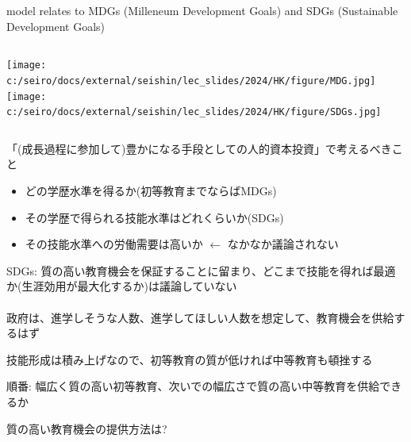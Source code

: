 \begin{frame}{}
\citet{BalandRobinson2000} model relates to MDGs (Milleneum Development Goals) and SDGs (Sustainable Development Goals)\\ 
\hfil\begin{columns}[T]
\column{.4\paperwidth}
\texttt{[image: c:/seiro/docs/external/seishin/lec\_slides/2024/HK/figure/MDG.jpg]}
\column{.4\paperwidth}
\texttt{[image: c:/seiro/docs/external/seishin/lec\_slides/2024/HK/figure/SDGs.jpg]}
\end{columns}

\vspace{2ex}
\pause
「(成長過程に参加して)豊かになる手段としての人的資本投資」で考えるべきこと
\begin{itemize}
\vspace{1.0ex}\setlength{\itemsep}{1.0ex}\setlength{\baselineskip}{12pt}
\pause
\item	どの学歴水準を得るか(初等教育までならばMDGs)
\pause
\item	その学歴で得られる技能水準はどれくらいか(SDGs)
\pause
\item	その技能水準への労働需要は高いか\pause
 $\leftarrow$ なかなか議論されない
\end{itemize}
\end{frame}

\begin{frame}{}
SDGs: 質の高い教育機会を保証することに留まり、どこまで技能を得れば最適か(生涯効用が最大化するか)は議論していない\\~\\
政府は、進学しそうな人数、進学してほしい人数を想定して、教育機会を供給するはず%
\begin{dinglist}{43}
\vspace{1.0ex}\setlength{\itemsep}{1.0ex}\setlength{\baselineskip}{12pt}
\pause
\item	技能形成は積み上げなので、初等教育の質が低ければ中等教育も頓挫する
\pause
\item	順番: 幅広く質の高い初等教育、次いでの幅広さで質の高い中等教育を供給できるか
\pause
\item	質の高い教育機会の提供方法は?
\end{dinglist}
\end{frame}

